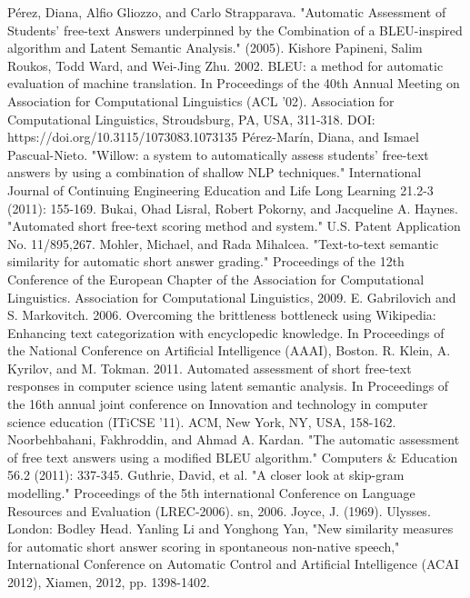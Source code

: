 \documentclass[11pt]{report}
\numberwithin{equation}{section} %
\begin{document}
\begin{thebibliography}{3}
 Pérez, Diana, Alfio Gliozzo, and Carlo Strapparava. "Automatic Assessment of Students’ free-text Answers underpinned by the Combination of a BLEU-inspired algorithm and Latent Semantic Analysis." (2005).
 Kishore Papineni, Salim Roukos, Todd Ward, and Wei-Jing Zhu. 2002. BLEU: a method for automatic evaluation of machine translation. In Proceedings of the 40th Annual Meeting on Association for Computational Linguistics (ACL '02). Association for Computational Linguistics, Stroudsburg, PA, USA, 311-318. DOI: https://doi.org/10.3115/1073083.1073135
 Pérez-Marín, Diana, and Ismael Pascual-Nieto. "Willow: a system to automatically assess students’ free-text answers by using a combination of shallow NLP techniques." International Journal of Continuing Engineering Education and Life Long Learning 21.2-3 (2011): 155-169.
 Bukai, Ohad Lisral, Robert Pokorny, and Jacqueline A. Haynes. "Automated short free-text scoring method and system." U.S. Patent Application No. 11/895,267.
 Mohler, Michael, and Rada Mihalcea. "Text-to-text semantic similarity for automatic short answer grading." Proceedings of the 12th Conference of the European Chapter of the Association for Computational Linguistics. Association for Computational Linguistics, 2009.
 E. Gabrilovich and S. Markovitch. 2006. Overcoming the brittleness bottleneck using Wikipedia: Enhancing text categorization with encyclopedic knowledge. In Proceedings of the National Conference on Artificial Intelligence (AAAI), Boston.
 R. Klein, A. Kyrilov, and M. Tokman. 2011. Automated assessment of short free-text responses in computer science using latent semantic analysis. In Proceedings of the 16th annual joint conference on Innovation and technology in computer science education (ITiCSE '11). ACM, New York, NY, USA, 158-162. 
 Noorbehbahani, Fakhroddin, and Ahmad A. Kardan. "The automatic assessment of free text answers using a modified BLEU algorithm." Computers \& Education 56.2 (2011): 337-345.
 Guthrie, David, et al. "A closer look at skip-gram modelling." Proceedings of the 5th international Conference on Language Resources and Evaluation (LREC-2006). sn, 2006.
 Joyce, J. (1969). Ulysses. London: Bodley Head.
 Yanling Li and Yonghong Yan, "New similarity measures for automatic short answer scoring in spontaneous non-native speech," International Conference on Automatic Control and Artificial Intelligence (ACAI 2012), Xiamen, 2012, pp. 1398-1402.

\end{thebibliography}
\end{document}
